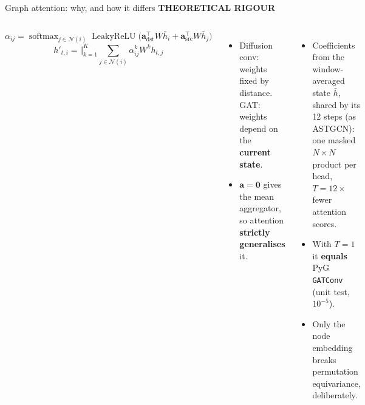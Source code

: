 \documentclass[aspectratio=169,11pt]{beamer}
\newcommand{\kicker}[1]{{\color{accent}\scriptsize\bfseries\MakeUppercase{#1}}\par\vspace{0.3em}}
\newcommand{\hl}[1]{{\color{accent}\bfseries #1}}
\begin{document}
\begin{frame}{Graph attention: why, and how it differs}
\kicker{Theoretical rigour}
\begin{columns}[T]
\small
\[
\alpha_{ij}=\operatorname{softmax}_{j\in\mathcal{N}(i)}\operatorname{LeakyReLU}\big(\mathbf{a}_{\mathrm{dst}}^{\top}W\bar h_i+\mathbf{a}_{\mathrm{src}}^{\top}W\bar h_j\big)
\]
\[
h'_{t,i}=\big\Vert_{k=1}^{K}\textstyle\sum_{j\in\mathcal{N}(i)}\alpha^{k}_{ij}W^{k}h_{t,j}
\]
\begin{itemize}\setlength\itemsep{0.35em}\small
\item Diffusion conv: weights fixed by distance. GAT: weights depend on the \hl{current state}.
\item $\mathbf{a}=\mathbf{0}$ gives the mean aggregator, so attention \hl{strictly generalises} it.
\end{itemize}
\begin{itemize}\setlength\itemsep{0.35em}\small
\item Coefficients from the window-averaged state $\bar h$, shared by its 12 steps (as ASTGCN): one masked $N{\times}N$ product per head, $T{=}12\times$ fewer attention scores.
\item With $T{=}1$ it \hl{equals} PyG \texttt{GATConv} (unit test, $10^{-5}$).
\item Only the node embedding breaks permutation equivariance, deliberately.
\end{itemize}
\end{columns}
\end{frame}
\end{document}
